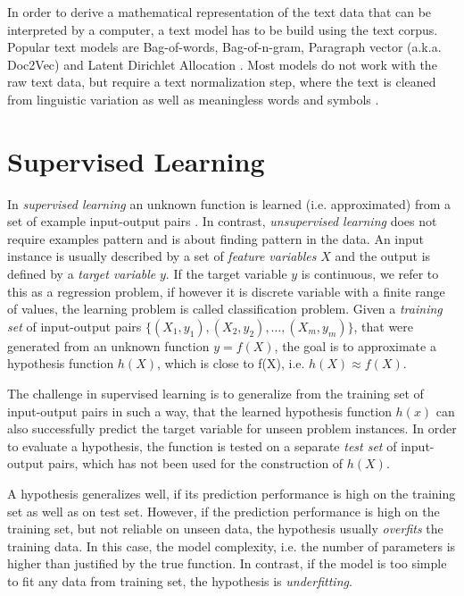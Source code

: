 In order to derive a mathematical representation of the text data that can be interpreted by a computer, a text model has to be build using the text corpus.
Popular text models are Bag-of-words, Bag-of-n-gram, Paragraph vector (a.k.a. Doc2Vec) \cite{DBLP:conf/icml/LeM14} and Latent Dirichlet Allocation \cite{DBLP:journals/jmlr/BleiNJ03}.
Most models do not work with the raw text data, but require a text normalization step, where the text is cleaned from linguistic variation as well as meaningless words and symbols \cite{DBLP:books/lib/JurafskyM09}.

\section{Supervised Learning}

In \textit{supervised learning} an unknown function is learned (i.e. approximated) from a set of example input-output pairs \cite{DBLP:books/daglib/0023820}.
In contrast, \textit{unsupervised learning} does not require examples pattern and is about finding pattern in the data. 
An input instance is usually described by a set of \textit{feature variables} $X$ and the output is defined by a \textit{target variable} $y$.
If the target variable $y$ is continuous, we refer to this as a regression problem, if however it is discrete variable with a finite range of values, the learning problem is called classification problem.
Given a \textit{training set} of input-output pairs $\{(X_1, y_1), (X_2, y_2), \dots, (X_m,y_m)\}$, that were generated from an unknown function $y = f(X)$, the goal is to approximate a hypothesis function $h(X)$, which is close to f(X), i.e. $h(X) \approx f(X)$.

The challenge in supervised learning is to generalize from the training set of input-output pairs in such a way, that the learned hypothesis function $h(x)$ can also successfully predict the target variable for unseen problem instances.
In order to evaluate a hypothesis, the function is tested on a separate \textit{test set} of input-output pairs, which has not been used for the construction of $h(X)$.

A hypothesis generalizes well, if its prediction performance is high on the training set as well as on test set.
However, if the prediction performance is high on the training set, but not reliable on unseen data, the hypothesis usually \textit{overfits} the training data.
In this case, the model complexity, i.e. the number of parameters is higher than justified by the true function. 
In contrast, if the model is too simple to fit any data from training set, the hypothesis is \textit{underfitting}.

